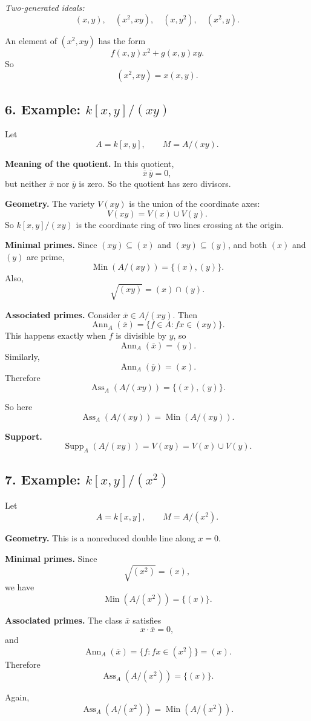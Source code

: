 \documentclass[12pt,a4paper]{article}
\theoremstyle{notespace}
\DeclareMathOperator{\Ass}{Ass}
\DeclareMathOperator{\Ann}{Ann}
\DeclareMathOperator{\Supp}{Supp}
\DeclareMathOperator{\Min}{Min}
\begin{document}
\emph{Two-generated ideals:}
\[
(x,y),\quad (x^2,xy),\quad (x,y^2),\quad (x^2,y).
\]

An element of \((x^2,xy)\) has the form
\[
f(x,y)x^2+g(x,y)xy.
\]
So
\[
(x^2,xy)=x(x,y).
\]

\subsection{6. Example: \(k[x,y]/(xy)\)}

Let
\[
A=k[x,y],\qquad M=A/(xy).
\]

\textbf{Meaning of the quotient.}
In this quotient,
\[
\overline x\,\overline y=0,
\]
but neither \(\overline x\) nor \(\overline y\) is zero.
So the quotient has zero divisors.

\textbf{Geometry.}
The variety \(V(xy)\) is the union of the coordinate axes:
\[
V(xy)=V(x)\cup V(y).
\]
So \(k[x,y]/(xy)\) is the coordinate ring of two lines crossing at the origin.

\textbf{Minimal primes.}
Since \((xy)\subseteq (x)\) and \((xy)\subseteq (y)\), and both \((x)\) and \((y)\) are prime,
\[
\Min(A/(xy))=\{(x),(y)\}.
\]
Also,
\[
\sqrt{(xy)}=(x)\cap (y).
\]

\textbf{Associated primes.}
Consider \(\overline x\in A/(xy)\). Then
\[
\Ann_A(\overline x)=\{f\in A:fx\in (xy)\}.
\]
This happens exactly when \(f\) is divisible by \(y\), so
\[
\Ann_A(\overline x)=(y).
\]
Similarly,
\[
\Ann_A(\overline y)=(x).
\]
Therefore
\[
\Ass_A(A/(xy))=\{(x),(y)\}.
\]

So here
\[
\Ass_A(A/(xy))=\Min(A/(xy)).
\]

\textbf{Support.}
\[
\Supp_A(A/(xy))=V(xy)=V(x)\cup V(y).
\]

\subsection{7. Example: \(k[x,y]/(x^2)\)}

Let
\[
A=k[x,y],\qquad M=A/(x^2).
\]

\textbf{Geometry.}
This is a nonreduced double line along \(x=0\).

\textbf{Minimal primes.}
Since
\[
\sqrt{(x^2)}=(x),
\]
we have
\[
\Min(A/(x^2))=\{(x)\}.
\]

\textbf{Associated primes.}
The class \(\overline x\) satisfies
\[
x\cdot \overline x=0,
\]
and
\[
\Ann_A(\overline x)=\{f:fx\in (x^2)\}=(x).
\]
Therefore
\[
\Ass_A(A/(x^2))=\{(x)\}.
\]

Again,
\[
\Ass_A(A/(x^2))=\Min(A/(x^2)).
\]
\end{document}
